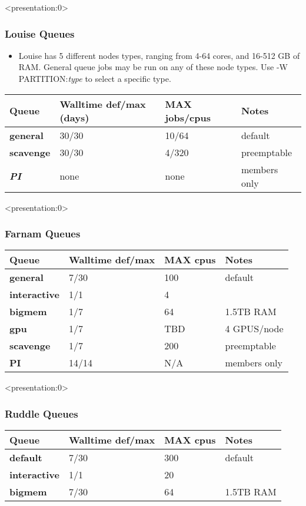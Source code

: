 \documentclass[10pt]{beamer}
\begin{document}
\begin{frame}<presentation:0>
\frametitle{Louise Queues}

\begin{itemize}
\item Louise has 5 different nodes types, ranging from 4-64 cores, and 16-512 GB of RAM.  General queue jobs may be run on any
of these node types.  Use -W PARTITION:\textit{type} to select a specific type. 
\end{itemize}

\begin{tabular}{|l|l|l|l|}
\hline
\textbf{Queue} & \textbf{Walltime def/max (days)}& \textbf{MAX jobs/cpus} & \textbf{Notes} \\
\hline
\textbf{general} & 30/30 &  10/64 & default \\
\hline
\textbf{scavenge} & 30/30 &  4/320 & preemptable \\
\hline
\textbf{\textit{PI}} & none & none & members only \\
\hline
\end{tabular}

\end{frame}

\begin{frame}<presentation:0>

\frametitle{Farnam Queues}

\begin{tabular}{|l|l|l|l|}
\hline
\textbf{Queue} & \textbf{Walltime def/max}& \textbf{MAX cpus} & \textbf{Notes} \\
\hline
\textbf{general} & 7/30 &  100 & default \\
\hline
\textbf{interactive} & 1/1 & 4 &  \\
\hline
\textbf{bigmem} & 1/7 & 64 & 1.5TB RAM \\
\hline
\textbf{gpu} & 1/7 & TBD & 4 GPUS/node \\
\hline
\textbf{scavenge} & 1/7 & 200 & preemptable \\
\hline
\textbf{PI} & 14/14 & N/A & members only \\
\hline
\end{tabular}

\end{frame}

\begin{frame}<presentation:0>
\frametitle{Ruddle Queues}

\begin{tabular}{|l|l|l|l|}
\hline
\textbf{Queue} & \textbf{Walltime def/max}& \textbf{MAX cpus} & \textbf{Notes} \\
\hline
\textbf{default} & 7/30 &  300 & default \\
\hline
\textbf{interactive} & 1/1 & 20 &  \\
\hline
\textbf{bigmem} & 7/30 & 64 & 1.5TB RAM \\
\hline
\end{tabular}

\end{frame}
\end{document}
